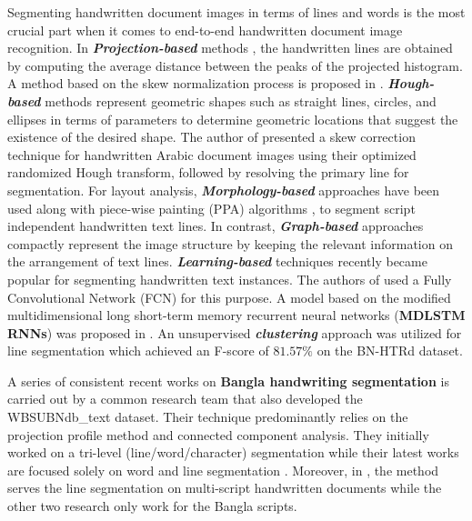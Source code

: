\documentclass[runningheads]{llncs}
\begin{document}
\raggedbottom
Segmenting handwritten document images in terms of lines and words is the most crucial part when it comes to end-to-end handwritten document image recognition. In \textit{\textbf{Projection-based}} methods \cite{fernandez2014graph}\cite{nicolaou2009handwritten}\cite{mullick2015efficient}\cite{boukharouba2017new}, the handwritten lines are obtained by computing the average distance between the peaks of the projected histogram. A method based on the skew normalization process is proposed in \cite{bal2018improved}. \textbf{\textit{Hough-based}} methods \cite{fernandez2014graph} represent geometric shapes such as straight lines, circles, and ellipses in terms of parameters to determine geometric locations that suggest the existence of the desired shape. The author of \cite{boukharouba2017new} presented a skew correction technique for handwritten Arabic document images using their optimized randomized Hough transform, followed by resolving the primary line for segmentation. For layout analysis, \textit{\textbf{Morphology-based}} approaches \cite{fernandez2014graph}\cite{boudraa2017improved} have been used along with piece-wise painting (PPA) algorithms \cite{alaei2011new}, to segment script independent handwritten text lines. In contrast, \textit{\textbf{Graph-based}} approaches \cite{fernandez2014graph}\cite{surinta2014path}\cite{kumar2011segmentation} compactly represent the image structure by keeping the relevant information on the arrangement of text lines. \textbf{\textit{Learning-based}} techniques recently became popular for segmenting handwritten text instances. The authors of \cite{renton2017handwritten}\cite{vo2016dense}\cite{renton2018fully}\cite{barakat2018text} used a Fully Convolutional Network (FCN) for this purpose.
A model based on the modified multidimensional long short-term memory recurrent neural networks (\textbf{MDLSTM RNNs}) was proposed in \cite{bluche2016joint}. An unsupervised \textbf{\textit{clustering}} approach \cite{rahman2023bn} was utilized for line segmentation which achieved an F-score of $81.57\%$ on the BN-HTRd dataset.

A series of consistent recent works on \textbf{Bangla handwriting segmentation} \cite{rakshit2018line}\cite{agarwal2022word}\cite{rakshit2023generalized} is carried out by a common research team that also developed the WBSUBNdb\_text dataset. Their technique predominantly relies on the projection profile method and connected component analysis. They initially worked on a tri-level (line/word/character) segmentation \cite{rakshit2018line} while their latest works are focused solely on word \cite{agarwal2022word} and line segmentation \cite{rakshit2023generalized}. Moreover, in \cite{rakshit2023generalized}, the method serves the line segmentation on multi-script handwritten documents while the other two research only work for the Bangla scripts.
\end{document}
